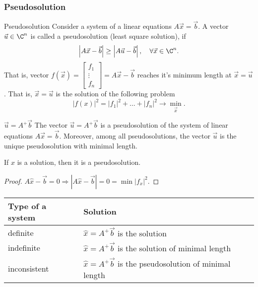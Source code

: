 \subsubsection*{Pseudosolution}
    \begin{definition}{Pseudosolution}{}
        Consider a system of a linear equations $A\vec{x} = \vec{b}$. A vector $\vec{u} \in \C^n$ is called a pseudosolution (least square solution), if
        \[
            \left| A\vec{x} - \vec{b} \right| \ge \left| A\vec{u} - \vec{b} \right|,
            \quad
            \forall \vec{x} \in \C^n. 
        \]
        That is, vector $f(\vec{x}) =\begin{bmatrix}f_1\\ \vdots\\f_n\end{bmatrix}= A\vec{x}-\vec{b}$ reaches it's minimum length at $\vec{x}=\vec{u}$. That is, $\vec{x}=\vec{u}$ is the solution of the following problem
        $$|f(x)|^2 = |f_1|^2 + \ldots + |f_n|^2 \rightarrow \mathop{min}_{\vec{x}}.$$ 
    \end{definition}
    \begin{theorema}{$\vec{u} = A^+\vec{b}$}{}
        The vector $\vec{u} = A^+\vec{b}$ is a pseudosolution of the system of linear equations $A\vec{x} = \vec{b}$. Moreover, among all pseudosolutions, the vector $\vec{u}$ is the unique pseudosolution with minimal length.
    \end{theorema}
    \begin{proposition}{}{}
        If $\hat{x}$ is a solution, then it is a pseudosolution.
    \end{proposition}
    \begin{proof}
        $A\hat{x} - \vec{b} = 0 \Longrightarrow \left| A\hat{x} - \vec{b} \right| = 0 = \min |f_x|^2.$
    \end{proof}
    \vspace*{0.2cm}
    \begin{proposition}{}{}
        \begin{tabular}{|l|l|}
            \hline
            Type of a system & Solution \\ \hline
            definite         &      $\hat{x}=A^+\vec{b}$  is the solution  \\ \hline
            indefinite       &   $\hat{x}=A^+\vec{b}$  is the solution of minimal length       \\ \hline
            inconsistent     &    $\hat{x}=A^+\vec{b}$  is the pseudosolution  of minimal length    \\ \hline
        \end{tabular}
    \end{proposition}

